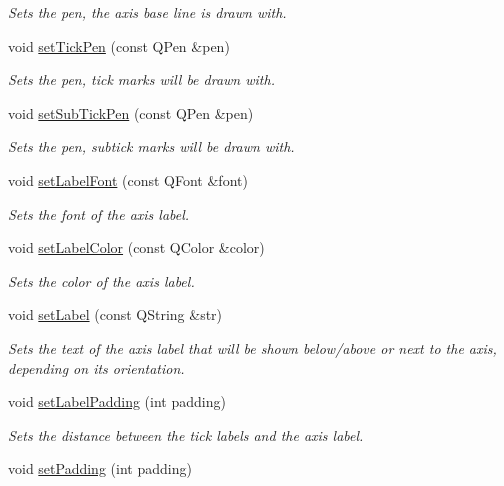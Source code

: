 \begin{DoxyCompactItemize}
\begin{DoxyCompactList}\small\item\em Sets the pen, the axis base line is drawn with. \end{DoxyCompactList}\item 
void \hyperlink{classQCPAxis_ad80923bcc1c5da4c4db602c5325e797e}{set\+Tick\+Pen} (const Q\+Pen \&pen)
\begin{DoxyCompactList}\small\item\em Sets the pen, tick marks will be drawn with. \end{DoxyCompactList}\item 
void \hyperlink{classQCPAxis_aede4028ae7516bd51a60618a8233f9cf}{set\+Sub\+Tick\+Pen} (const Q\+Pen \&pen)
\begin{DoxyCompactList}\small\item\em Sets the pen, subtick marks will be drawn with. \end{DoxyCompactList}\item 
void \hyperlink{classQCPAxis_a71ac1a47f7547e490a8c4311d1433cf3}{set\+Label\+Font} (const Q\+Font \&font)
\begin{DoxyCompactList}\small\item\em Sets the font of the axis label. \end{DoxyCompactList}\item 
void \hyperlink{classQCPAxis_a6c906fe56d75f0122335b9f79b999608}{set\+Label\+Color} (const Q\+Color \&color)
\begin{DoxyCompactList}\small\item\em Sets the color of the axis label. \end{DoxyCompactList}\item 
void \hyperlink{classQCPAxis_a33bcc382c111c9f31bb0687352a2dea4}{set\+Label} (const Q\+String \&str)
\begin{DoxyCompactList}\small\item\em Sets the text of the axis label that will be shown below/above or next to the axis, depending on its orientation. \end{DoxyCompactList}\item 
void \hyperlink{classQCPAxis_a4391192a766e5d20cfe5cbc17607a7a2}{set\+Label\+Padding} (int padding)
\begin{DoxyCompactList}\small\item\em Sets the distance between the tick labels and the axis label. \end{DoxyCompactList}\item 
void \hyperlink{classQCPAxis_a5691441cb3de9e9844855d339c0db279}{set\+Padding} (int padding)

\end{DoxyCompactItemize}
